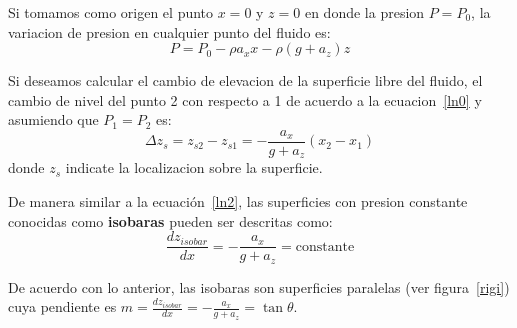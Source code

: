 \documentclass[10pt, oneside]{article}
\begin{document}
Si tomamos como origen el punto $x=0$ y $z=0$ en donde la presion $P=P_0$, la variacion de presion en cualquier punto del fluido es:
\begin{equation}
P = P_0 - \rho a_x x - \rho(g + a_z) z
\label{ln1}
\end{equation}

Si deseamos calcular el cambio de elevacion de la superficie libre del fluido, el cambio de nivel del punto 2 con respecto a 1 de acuerdo a la ecuacion~\ref{ln0} y asumiendo que $P_1 = P_2$ es:
\begin{equation}
\Delta z_s = z_{s2} - z_{s1} = -\frac{a_x}{g+a_z} (x_2 - x_1)
\label{ln2}
\end{equation}
donde $z_s$ indicate la localizacion sobre la superficie. 

De manera similar a la ecuaci\'on~\ref{ln2}, las superficies con presion constante conocidas como \textbf{isobaras} pueden ser descritas como:
\begin{equation}
\frac{d z_{isobar}}{dx} = -\frac{a_x}{g+a_z} = \text{constante}
\label{ln3}
\end{equation}

De acuerdo con lo anterior, las isobaras son superficies paralelas (ver figura~\ref{rigi}) cuya pendiente es $m = \frac{dz_{isobar}}{dx} = -\frac{a_x}{g+ a_z } = \tan \theta$.
\end{document}
